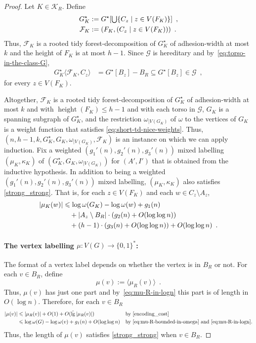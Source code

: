 \documentclass{patmorin}
\let\eqref\cref
\renewcommand{\le}{\leqslant}
\renewcommand{\leq}{\leqslant}
\newcommand{\torso}[2]{{#1}\langle{#2}\rangle}
\DeclareMathOperator{\height}{height}
\DeclareMathOperator{\lgg}{\hat{lg}}
\newcommand{\Oh}{O}
\DeclarePairedDelimiter{\set}{\{}{\}}
\newcommand{\calF}{\mathcal{F}}
\newcommand{\calG}{\mathcal{G}}
\newcommand{\calK}{\mathcal{K}}
\begin{document}
\begin{proof}
  Let $K\in\calK_R$. Define
  \begin{align*}
    G^\star_K
     & :=G^\star[\textstyle\bigcup\set{C_z\mid z\in V(F_K)}]\enspace, \\
    \calF_K
     & :=(F_K, (C_z \mid z\in V(F_K)))\enspace.
  \end{align*}
  Thus, $\calF_K$ is a rooted tidy forest-decomposition of $G^\star_K$ of adhesion-width at most $k$ and the height of $F_K$ is at most $h-1$.
  Since $\calG$ is hereditary and by~\eqref{eq:torso-in-the-class-G},
  \begin{align*}
    \torso{G^\star_K}{\calF_K,C_z}
     & =G^\star[B_z]-B_R\subseteq G^\star[B_z]\in \calG\enspace ,
  \end{align*}
  for every $z \in V(F_K)$.

  Altogether, $\calF_K$ is a rooted tidy forest-decomposition of $G^\star_K$ of adhesion-width at most $k$ and with $\height(F_K)\le h-1$ and with each torso in $\calG$, $G_K$ is a spanning subgraph of $G^\star_K$, and the restriction
  $\omega_{|V(G_K)}$ of $\omega$ to the vertices of $G_K$ is a weight function that satisfies \eqref{eq:short-td-nice-weights}.  Thus, $(n,h-1,k,G^\star_K,G_K,\omega_{|V(G_K)},\calF_K)$ is an instance on which we can apply induction.
  Fix a weighted $(g_1'(n),g_2'(n),g_3'(n))$ mixed labelling $(\mu_K,\kappa_K)$ of $(G^\star_K,G_K,\omega_{|V(G_K)})$ for $(A',I')$ that is obtained from the inductive hypothesis.
  In addition to being a weighted $(g_1'(n),g_2'(n),g_3'(n))$ mixed labelling, $(\mu_K,\kappa_K)$ also satisfies \eqref{strong_strong}.  That is, for each $z\in V(F_K)$ and each $w\in C_z\setminus A_z$,
  \begin{align}
    |\mu_K(w)|
     & \le \log \omega(G_K) - \log\omega(w) + g_1(n) \notag                                \\
     & \quad {} + |A_z\setminus B_R|\cdot (g_2(n) + \Oh(\log\log n)) \label{mu_Kw}         \\
     & \quad {} + (h-1)\cdot (g_3(n) + \Oh(\log\log n)) +\Oh(\log\log n) \enspace . \notag
  \end{align}

  \paragraph{\boldmath The vertex labelling $\mu:V(G)\to\{0,1\}^*$:}
  The format of a vertex label depends on whether the vertex is in $B_R$ or not.
  For each $v\in B_R$, define
  \[
    \mu(v) := \langle\mu_R(v)\rangle\enspace.
  \]
  Thus, $\mu(v)$ has just one part and
  by~\eqref{eq:mu-R-in-logn} this part is of length in $\Oh(\log n)$.
  Therefore,
  for each $v\in B_R$
  \begin{align*}
    |\mu(v)|
     & \leq |\mu_R(v)| + \Oh(1) + \Oh(\lgg|\mu_R(v)|)                &  & \text{by~\eqref{encoding_cost}}                                           \\
     & \leq \log\omega(G) - \log\omega(v) + g_1(n) + \Oh(\log\log n) &  & \textrm{by~\eqref{eq:mu-R-bounded-in-omega} and~\eqref{eq:mu-R-in-logn}.}
  \end{align*}
  Thus, the length of $\mu(v)$ satisfies \eqref{strong_strong} when $v\in B_R$.


\end{proof}
\end{document}
